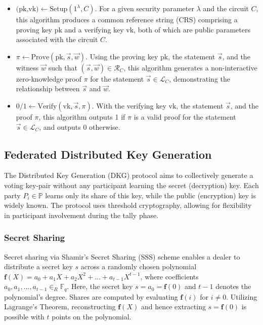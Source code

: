 \documentclass[runningheads]{llncs}
\begin{document}
\begin{itemize}
    \item $\textrm{(pk,vk)} \gets \textrm{Setup}(1^\lambda,C)$. For a given security parameter $\lambda$ and the circuit $C$, this algorithm produces a common reference string (CRS) comprising a proving key $\textrm{pk}$ and a verifying key $\textrm{vk}$, both of which are public parameters associated with the circuit $C$.
    \item $\pi \gets \textrm{Prove}(\textrm{pk}, \vec{s}, \vec{w})$. Using the proving key $\textrm{pk}$, the statement $\vec{s}$, and the witness $\vec{w}$ such that $(\vec{s}, \vec{w}) \in \mathcal{R}_C$, this algorithm generates a non-interactive zero-knowledge proof $\pi$ for the statement $\vec{s} \in \mathcal{L}_C$, demonstrating the relationship between $\vec{s}$ and $\vec{w}$.
    \item $0/1 \gets \textrm{Verify}(\textrm{vk}, \vec{s}, \pi)$. With the verifying key $\textrm{vk}$, the statement $\vec{s}$, and the proof $\pi$, this algorithm outputs 1 if $\pi$ is a valid proof for the statement $\vec{s} \in \mathcal{L}_C$, and outputs 0 otherwise.
\end{itemize}


\subsection{Federated Distributed Key Generation}
The Distributed Key Generation (DKG) protocol aims to collectively generate a voting key-pair without any participant learning the secret (decryption) key. Each party $P_i \in \mathbb{P}$ learns only its share of this key, while the public (encryption) key is widely known. The protocol uses threshold cryptography, allowing for flexibility in participant involvement during the tally phase.

\subsubsection*{Secret Sharing}
Secret sharing via Shamir's Secret Sharing (SSS) scheme enables a dealer to distribute a secret key $s$ across a randomly chosen polynomial $\mathbf{f}(X) = a_0 + a_1X + a_2X^2 + \dots + a_{t-1}X^{t-1}$, where coefficients $a_0,a_1,\dots,a_{t-1} \in_R \mathbb{F}_q$. Here, the secret key $s=a_0=\mathbf{f}(0)$ and $t-1$ denotes the polynomial's degree. Shares are computed by evaluating $\mathbf{f}(i)$ for $i \neq 0$. Utilizing Lagrange's Theorem, reconstructing $\mathbf{f}(X)$ and hence extracting $s = \mathbf{f}(0)$ is possible with $t$ points on the polynomial.
\end{document}
